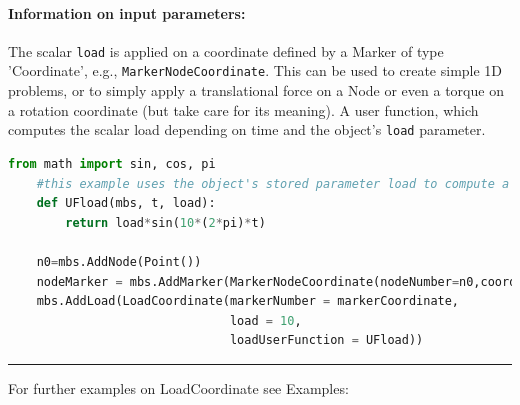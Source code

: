 \paragraph{Information on input parameters:} 
\finishTable
 \noindent
    The scalar \texttt{load} is applied on a coordinate defined by a Marker of type 'Coordinate', e.g., \texttt{MarkerNodeCoordinate}.
    This can be used to create simple 1D problems, or to simply apply a translational force on a Node or even a torque
    on a rotation coordinate (but take care for its meaning).
    A user function, which computes the scalar load depending on time and the object's \texttt{load} parameter.
    \finishTable
    \userFunctionExample{}
    \pythonstyle
    \begin{lstlisting}[language=Python]
    from math import sin, cos, pi
    #this example uses the object's stored parameter load to compute a time-dependent load
    def UFload(mbs, t, load): 
        return load*sin(10*(2*pi)*t)

    n0=mbs.AddNode(Point())
    nodeMarker = mbs.AddMarker(MarkerNodeCoordinate(nodeNumber=n0,coordinate=0))
    mbs.AddLoad(LoadCoordinate(markerNumber = markerCoordinate,
                               load = 10,
                               loadUserFunction = UFload))
    \end{lstlisting}
\vspace{6pt}\par\noindent\rule{\textwidth}{0.4pt}
%
\noindent For further examples on LoadCoordinate see Examples:
\bi
